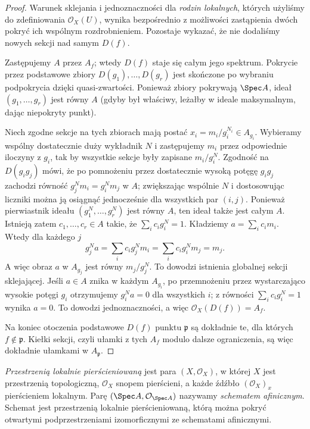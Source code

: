 \begin{proof}
Warunek sklejania i jednoznaczności dla \emph{rodzin
lokalnych}, których użyliśmy do zdefiniowania
$\mathcal O_X(U)$, wynika bezpośrednio z możliwości
zastąpienia dwóch pokryć ich wspólnym rozdrobnieniem.
Pozostaje wykazać, że nie dodaliśmy nowych sekcji
nad samym $D(f)$.

Zastępujemy $A$ przez $A_f$; wtedy $D(f)$ staje się
całym jego spektrum. Pokrycie przez podstawowe zbiory
$D(g_1),\ldots,D(g_r)$ jest skończone po wybraniu
podpokrycia dzięki quasi-zwartości. Ponieważ zbiory
pokrywają $\Spec A$, ideał $(g_1,\ldots,g_r)$
jest równy $A$ (gdyby był właściwy, leżałby w ideale
maksymalnym, dając niepokryty punkt).

Niech zgodne sekcje na tych zbiorach mają postać
$x_i=m_i/g_i^{N_i}\in A_{g_i}$.
Wybieramy wspólny dostatecznie duży wykładnik $N$
i zastępujemy $m_i$ przez odpowiednie iloczyny
z $g_i$, tak by wszystkie sekcje były zapisane
$m_i/g_i^N$. Zgodność na $D(g_ig_j)$ mówi,
że po pomnożeniu przez dostatecznie wysoką
potęgę $g_ig_j$ zachodzi równość
$g_j^N m_i=g_i^N m_j$ w $A$; zwiększając wspólnie
$N$ i dostosowując liczniki można ją osiągnąć
jednocześnie dla wszystkich par $(i,j)$.
Ponieważ pierwiastnik ideału $(g_1^N,\ldots,g_r^N)$
jest równy $A$, ten ideał także jest całym $A$.
Istnieją zatem $c_1,\ldots,c_r\in A$ takie,
że $\sum_i c_i g_i^N=1$. Kładziemy
$a=\sum_i c_i m_i$. Wtedy dla każdego $j$
\[
 g_j^N a=\sum_i c_i g_j^N m_i
 =\sum_i c_i g_i^N m_j=m_j.
\]
A więc obraz $a$ w $A_{g_j}$ jest równy
$m_j/g_j^N$. To dowodzi istnienia globalnej sekcji
sklejającej. Jeśli $a\in A$ znika w każdym $A_{g_i}$,
po przemnożeniu przez wystarczająco wysokie potęgi
$g_i$ otrzymujemy $g_i^N a=0$ dla wszystkich $i$;
z równości $\sum_i c_i g_i^N=1$ wynika $a=0$.
To dowodzi jednoznaczności, a więc
$\mathcal O_X(D(f))=A_f$.

Na koniec otoczenia podstawowe $D(f)$ punktu
$\mathfrak p$ są dokładnie te, dla których
$f\notin\mathfrak p$. Kiełki sekcji, czyli
ułamki z tych $A_f$ modulo dalsze ograniczenia,
są więc dokładnie ułamkami w $A_{\mathfrak p}$.
\end{proof}

\begin{definicja}
\emph{Przestrzenią lokalnie pierścieniowaną} jest para
$(X,\mathcal O_X)$, w której $X$ jest przestrzenią
topologiczną, $\mathcal O_X$ snopem pierścieni,
a każde źdźbło $(\mathcal O_X)_x$ pierścieniem lokalnym.
Parę $(\Spec A,\mathcal O_{\Spec A})$ nazywamy
\emph{schematem afinicznym}. Schemat jest przestrzenią
lokalnie pierścieniowaną, którą można pokryć otwartymi
podprzestrzeniami izomorficznymi ze schematami afinicznymi.
\end{definicja}

